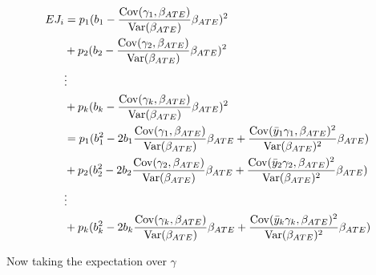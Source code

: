 \begin{align*}
	E J_i 
	&=  p_1 ( b_1 -  \frac{\mathrm{Cov}(\gamma_1, \beta_{ATE})}{\mathrm{Var}(\beta_{ATE})} \beta_{ATE})^2 \\
	& + p_2 ( b_2  - \frac{\mathrm{Cov}(\gamma_2, \beta_{ATE})}{\mathrm{Var}(\beta_{ATE})} \beta_{ATE})^2 \\
	&\vdots \\
	&+ p_k  ( b_k  - \frac{\mathrm{Cov}(\gamma_k, \beta_{ATE})}{\mathrm{Var}(\beta_{ATE})} \beta_{ATE})^2 \\
	&=  p_1 ( b_1^2 - 2 b_1\frac{\mathrm{Cov}(\gamma_1, \beta_{ATE})}{\mathrm{Var}(\beta_{ATE})} \beta_{ATE} + \frac{\mathrm{Cov}(\bar{y}_1 \gamma_1, \beta_{ATE})^2}{\mathrm{Var}(\beta_{ATE})^2} \beta_{ATE}) \\
	& + p_2 ( b_2^2 - 2 b_2\frac{\mathrm{Cov}(\gamma_2, \beta_{ATE})}{\mathrm{Var}(\beta_{ATE})} \beta_{ATE} + \frac{\mathrm{Cov}(\bar{y}_2 \gamma_2, \beta_{ATE})^2}{\mathrm{Var}(\beta_{ATE})^2} \beta_{ATE}) \\
	&\vdots \\                                                                                                                        
	&+ p_k  ( b_k^2 - 2 b_k\frac{\mathrm{Cov}(\gamma_k, \beta_{ATE})}{\mathrm{Var}(\beta_{ATE})} \beta_{ATE} + \frac{\mathrm{Cov}(\bar{y}_k \gamma_k, \beta_{ATE})^2}{\mathrm{Var}(\beta_{ATE})^2} \beta_{ATE}) \\
\end{align*}

Now taking the expectation over $\gamma$

